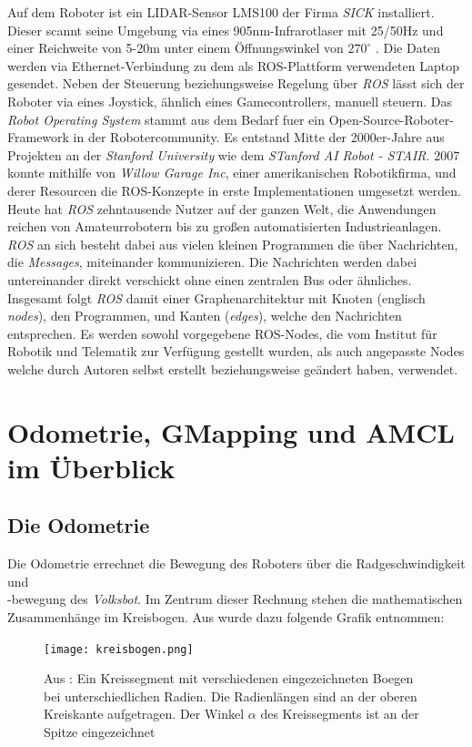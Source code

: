 \documentclass[11pt,a4paper]{article}
\begin{document}
Auf dem Roboter ist ein LIDAR-Sensor LMS100 der Firma \textit{SICK} installiert. Dieser scannt seine Umgebung via eines 905nm-Infrarotlaser 
mit 25/50Hz und einer Reichweite von 5-20m unter einem Öffnungswinkel von $270^\circ$ \cite{website:LMS100}. Die Daten werden via Ethernet-Verbindung zu dem als ROS-Plattform verwendeten
Laptop gesendet. Neben der Steuerung beziehungsweise Regelung über \textit{ROS} lässt sich der Roboter via eines Joystick, ähnlich eines Gamecontrollers, manuell steuern.
Das \textit{Robot Operating System}  stammt aus dem Bedarf fuer ein Open-Source-Roboter-Framework in der Robotercommunity.
Es entstand Mitte der 2000er-Jahre aus Projekten an der \textit{Stanford University} wie dem \textit{STanford AI Robot - STAIR}.
2007 konnte mithilfe von \textit{Willow Garage Inc}, einer amerikanischen Robotikfirma, und derer
Resourcen die ROS-Konzepte in erste Implementationen umgesetzt werden. Heute hat \textit{ROS} zehntausende Nutzer auf der ganzen Welt,
die Anwendungen reichen von Amateurrobotern bis zu großen automatisierten Industrieanlagen. 
\textit{ROS} an sich besteht dabei aus vielen kleinen Programmen die über Nachrichten, die \textit{Messages}, miteinander kommunizieren.
Die Nachrichten werden dabei untereinander direkt verschickt ohne einen zentralen Bus oder ähnliches. Insgesamt
folgt \textit{ROS} damit einer Graphenarchitektur mit Knoten (englisch \textit{nodes}), den Programmen, und Kanten (\textit{edges}), welche den Nachrichten entsprechen. \cite{quigley2015programming}
Es werden sowohl vorgegebene ROS-Nodes, die vom Institut für Robotik und Telematik zur Verfügung gestellt wurden, als auch angepasste Nodes welche durch Autoren selbst erstellt beziehungsweise
geändert haben, verwendet. 
\section{Odometrie, GMapping und AMCL im Überblick}
\subsection*{Die Odometrie}
Die Odometrie errechnet die Bewegung des Roboters über die Radgeschwindigkeit und \\ -bewegung 
des \textit{Volksbot}. Im Zentrum dieser Rechnung stehen die mathematischen Zusammenhänge im Kreisbogen. 
Aus \cite{website:dresden} wurde dazu folgende Grafik entnommen:

\begin{figure}[ht]
  \centering
  \texttt{[image: kreisbogen.png]}
  \caption{Aus \cite{website:dresden}: Ein Kreissegment mit verschiedenen eingezeichneten Boegen bei unterschiedlichen Radien. Die Radienlängen sind an der oberen Kreiskante 
  aufgetragen. Der Winkel $\alpha$ des Kreissegments ist an der Spitze eingezeichnet}
  \label{fig: Kreissegment}
\end{figure}
\end{document}
